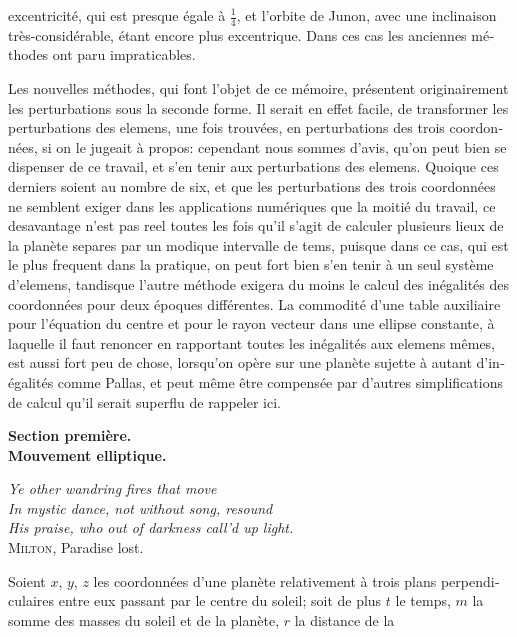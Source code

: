 \documentclass[12pt,a4paper]{article}
\begin{document}
\newpage
\setcounter{page}{450}
%
\begin{otherlanguage}{french}
excentricité, qui est presque égale à $\frac{1}{4}$, et l'orbite de Junon, avec une inclinaison très-considérable, étant encore plus excentrique. Dans ces cas les anciennes méthodes ont paru impraticables.

Les nouvelles méthodes, qui font l'objet de ce mémoire, présentent originairement les perturbations sous la seconde forme. Il serait en effet facile, de transformer les perturbations des elemens, une fois trouvées, en perturbations des trois coordonnées, si on le jugeait à propos: cependant nous sommes d'avis, qu'on peut bien se dispenser de ce travail, et s'en tenir aux perturbations des elemens. Quoique ces derniers soient au nombre de six, et que les perturbations des trois coordonnées ne semblent exiger dans les applications numériques que la moitié du travail, ce desavantage n'est pas reel toutes les fois qu'il s'agit de calculer plusieurs lieux de la planète separes par un modique intervalle de tems, puisque dans ce cas, qui est le plus frequent dans la pratique, on peut fort bien s'en tenir à un seul système d'elemens, tandisque l'autre méthode exigera du moins le calcul des inégalités des coordonnées pour deux époques différentes. La commodité d'une table auxiliaire pour l'équation du centre et pour le rayon vecteur dans une ellipse constante, à laquelle il faut renoncer en rapportant toutes les inégalités aux elemens mêmes, est aussi fort peu de chose, lorsqu'on opère sur une planète sujette à autant d'inégalités comme Pallas, et peut même être compensée par d'autres simplifications de calcul qu'il serait superflu de rappeler ici.

\medskip
\textbf{Section première.}\\
\textbf{Mouvement elliptique.}

\medskip
\textit{Ye other wandring fires that move}\\
\textit{In mystic dance, not without song, resound}\\
\textit{His praise, who out of darkness call'd up light.}\\
\textsc{Milton}, Paradise lost.

\medskip
Soient $x$, $y$, $z$ les coordonnées d'une planète relativement à trois plans perpendiculaires entre eux passant par le centre du soleil; soit de plus $t$ le temps, $m$ la somme des masses du soleil et de la planète, $r$ la distance de la
\end{otherlanguage}
\end{document}
